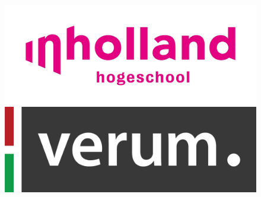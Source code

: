 \documentclass[12pt]{scrreprt}
\begin{document}
\begin{titlepage}
\begin{figure}[H]
  \centering
  \begin{minipage}[b]{0.4\textwidth}
    \includegraphics[width=\textwidth]{Figures/inholland.jpg}  \end{minipage}
  \hfill
  \begin{minipage}[b]{0.4\textwidth}
    \includegraphics[width=\textwidth]{Figures/verum_logo.png}
  \end{minipage}
\end{figure}


\vfill %
\end{titlepage}

%
%
%
%
%
%
\end{document}
